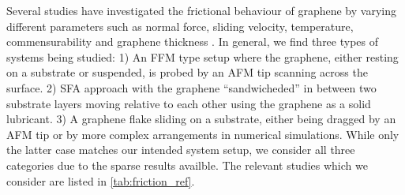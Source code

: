 Several studies have investigated the frictional behaviour of graphene by varying different parameters such as normal force, sliding velocity, temperature, commensurability and graphene thickness \cite{penkov_tribology_2014}. In general, we find three types of systems being studied: 1) An \acrshort{FFM} type setup where the graphene, either resting on a substrate or suspended, is probed by an \acrshort{AFM} tip scanning across the surface. 2) \acrshort{SFA} approach with the graphene ``sandwicheded'' in between two substrate layers moving relative to each other using the graphene as a solid lubricant. 3) A graphene flake sliding on a substrate, either being dragged by an \acrshort{AFM} tip or by more complex arrangements in numerical simulations. While only the latter case matches our intended system setup, we consider all three categories due to the sparse results availble. The relevant studies which we consider are listed in \cref{tab:friction_ref}. 




